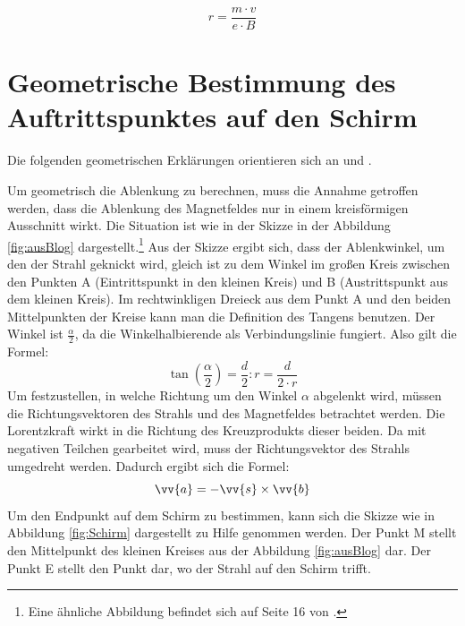 \begin{equation}
     \label{eq:r}
     r = \frac{m \cdot v}{e \cdot B}
\end{equation}

\section{Geometrische Bestimmung des Auftrittspunktes auf den Schirm}
\label{sec:g}
Die folgenden geometrischen Erklärungen orientieren sich an \cite{Blog} und \cite{Gente1950}.

Um geometrisch die Ablenkung zu berechnen, muss die Annahme getroffen werden, dass die Ablenkung des Magnetfeldes nur in einem kreisförmigen Ausschnitt wirkt.
Die Situation ist wie in der Skizze in der Abbildung \ref{fig:ausBlog} dargestellt.\footnote{Eine ähnliche Abbildung befindet sich auf Seite 16 von \cite{Gente1950}.}
Aus der Skizze ergibt sich, dass der Ablenkwinkel, um den der Strahl geknickt wird, gleich ist zu dem Winkel im großen Kreis zwischen den Punkten A (Eintrittspunkt in den kleinen Kreis) und B (Austrittspunkt aus dem kleinen Kreis).
Im rechtwinkligen Dreieck aus dem Punkt A und den beiden Mittelpunkten der Kreise kann man die Definition des Tangens benutzen.
Der Winkel ist $\frac{\alpha}{2}$, da die Winkelhalbierende als Verbindungslinie fungiert.
Also gilt die Formel:
\begin{equation}
    \label{eq:tan}
    \tan(\frac{\alpha}{2}) = \frac{d}{2}:r = \frac{d}{2 \cdot r}
\end{equation}
Um festzustellen, in welche Richtung um den Winkel $\alpha$ abgelenkt wird, müssen die Richtungsvektoren des Strahls und des Magnetfeldes betrachtet werden.
Die Lorentzkraft wirkt in die Richtung des Kreuzprodukts dieser beiden.
Da mit negativen Teilchen gearbeitet wird, muss der Richtungsvektor des Strahls umgedreht werden. Dadurch ergibt sich die Formel: \begin{equation}
    \label{eq:a}
    \vv{a} = - \vv{s}\times \vv{b}
\end{equation}
Um den Endpunkt auf dem Schirm zu bestimmen, kann sich die Skizze wie in Abbildung \ref{fig:Schirm} dargestellt zu Hilfe genommen werden.
Der Punkt M stellt den Mittelpunkt des kleinen Kreises aus der Abbildung \ref{fig:ausBlog} dar.
Der Punkt E stellt den Punkt dar, wo der Strahl auf den Schirm trifft.
